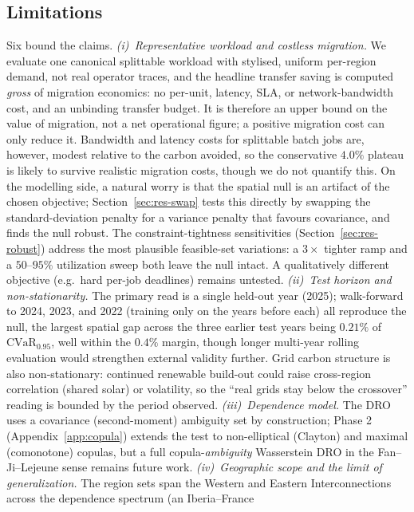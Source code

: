 \documentclass[12pt]{article}
\newcommand{\CVaR}{\mathrm{CVaR}}
\begin{document}
\subsection{Limitations}\label{sec:limits}
Six bound the claims. \emph{(i)~Representative workload and costless migration.} We
evaluate one canonical splittable workload with stylised, uniform per-region demand,
not real operator traces, and the headline transfer saving is computed \emph{gross} of
migration economics: no per-unit, latency, SLA, or network-bandwidth cost, and an
unbinding transfer budget. It is therefore an upper bound on the value of migration,
not a net operational figure; a positive migration cost can only reduce it. Bandwidth and
latency costs for splittable batch jobs are, however, modest relative to the carbon
avoided, so the conservative $4.0\%$ plateau is likely to survive realistic migration
costs, though we do not quantify this. On the modelling side, a natural worry is that the
spatial null is an artifact of the chosen objective; Section~\ref{sec:res-swap} tests this
directly by swapping the standard-deviation penalty for a variance penalty that favours
covariance, and finds the null robust. The constraint-tightness
sensitivities (Section~\ref{sec:res-robust}) address the most plausible feasible-set
variations: a $3\times$ tighter ramp and a $50$--$95\%$ utilization sweep both leave the
null intact. A qualitatively different objective (e.g.\ hard per-job deadlines) remains
untested.
\emph{(ii)~Test horizon and non-stationarity.} The primary read is a single held-out
year (2025); walk-forward to 2024, 2023, and 2022 (training only on the years before each)
all reproduce the null, the largest spatial gap across the three earlier test years being
$0.21\%$ of $\CVaR_{0.95}$, well within the $0.4\%$ margin, though longer multi-year
rolling evaluation would strengthen external validity further. Grid carbon structure is also non-stationary:
continued renewable build-out could raise cross-region correlation (shared solar) or
volatility, so the ``real grids stay below the crossover'' reading is bounded by the
period observed. \emph{(iii)~Dependence model.} The DRO uses a
covariance (second-moment) ambiguity set by construction; Phase 2
(Appendix~\ref{app:copula}) extends the test to non-elliptical (Clayton) and maximal
(comonotone) copulas, but a full copula-\emph{ambiguity} Wasserstein DRO in the
Fan--Ji--Lejeune sense remains future work. \emph{(iv)~Geographic scope and the limit of generalization.} The region sets span
the Western and Eastern Interconnections across the dependence spectrum (an Iberia--France
\end{document}
